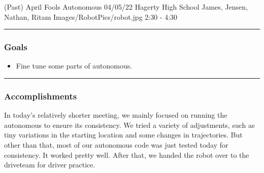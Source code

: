 \insertmeeting 
	{(Past) April Fools Autonomous} 
	{04/05/22} 
	{Hagerty High School}
	{James, Jensen, Nathan, Ritam}
	{Images/RobotPics/robot.jpg}
	{2:30 - 4:30}
	
\noindent\hfil\rule{\textwidth}{.4pt}\hfil
\subsubsection*{Goals}
\begin{itemize}
    \item Fine tune some parts of autonomous.

\end{itemize} 

\noindent\hfil\rule{\textwidth}{.4pt}\hfil

\subsubsection*{Accomplishments}
In today's relatively shorter meeting, we mainly focused on running the autonomous to ensure its consistency. We tried a variety of adjustments, such as tiny variations in the starting location and some changes in trajectories. But other than that, most of our autonomous code was just tested today for consistency. It worked pretty well. After that, we handed the robot over to the driveteam for driver practice. 


